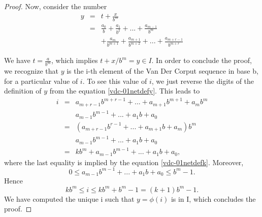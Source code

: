 \begin{proof}
Now, consider the number 
\begin{eqnarray}
y&=&t+\frac{x}{b^m} \\
 &=&\frac{a_0}{b}+\frac{a_1}{b^2}+...+\frac{a_{m-1}}{b^m} \nonumber \\
  &&+\frac{a_m}{b^{m+1}}+\frac{a_{m+1}}{b^{m+2}}+...+\frac{a_{m+r-1}}{b^{m+r}}
  \label{vdc-01netdefy}
\end{eqnarray}

We have $t=\frac{a}{b^m}$, which implies $t+x/b^m=y \in I$. 
In order to conclude the proof, we recognize that $y$ 
is the i-th element of the Van Der Corput sequence in base b, 
for a particular value of $i$. 
To see this value of $i$, we just reverse the digits 
of the definition of $y$ from the equation \ref{vdc-01netdefy}. 
This leads to 
\begin{eqnarray}
i &=& a_{m+r-1} b^{m+r-1}+...+a_{m+1} b^{m+1}+a_m b^m \nonumber \\
  & & a_{m-1}b^{m-1}+...+a_1b+a_0 \\
  &=& \left( a_{m+r-1} b^{r-1}+...+a_{m+1} b+a_m\right) b^m \nonumber \\
  & & a_{m-1}b^{m-1}+...+a_1b+a_0 \\
  &=& kb^m+a_{m-1}b^{m-1}+...+a_1b+a_0,
\end{eqnarray}
where the last equality is implied by the equation \ref{vdc-01netdefk}.
Moreover, 
$$
0\leq a_{m-1} b^{m-1}+...+a_1 b+a_0 \leq b^m-1. 
$$
Hence 
$$
k b^m \leq i \leq kb^m+b^m-1=(k+1)b^m-1.
$$
We have computed the unique i such that 
$y=\phi(i)$ is in I, which concludes the proof. 
\end{proof}
